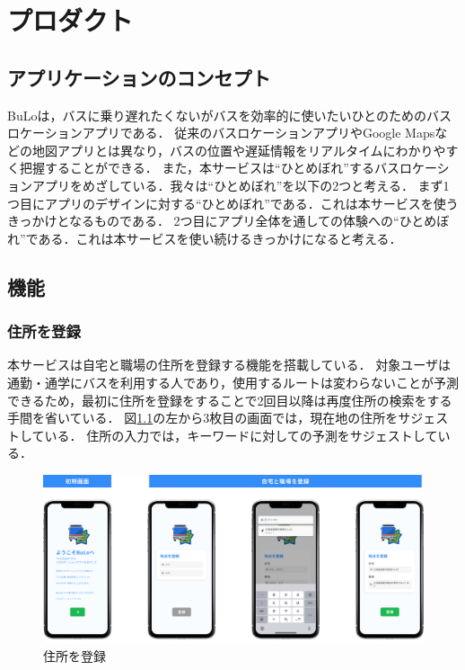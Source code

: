 \chapter{プロダクト}

\section{アプリケーションのコンセプト}
BuLoは，バスに乗り遅れたくないがバスを効率的に使いたいひとのためのバスロケーションアプリである．
従来のバスロケーションアプリやGoogle Mapsなどの地図アプリとは異なり，バスの位置や遅延情報をリアルタイムにわかりやすく把握することができる．
また，本サービスは``ひとめぼれ''するバスロケーションアプリをめざしている．我々は``ひとめぼれ''を以下の2つと考える．
まず1つ目にアプリのデザインに対する``ひとめぼれ''である．これは本サービスを使うきっかけとなるものである．
2つ目にアプリ全体を通しての体験への``ひとめぼれ''である．これは本サービスを使い続けるきっかけになると考える．

\section{機能}
\subsection{住所を登録}
本サービスは自宅と職場の住所を登録する機能を搭載している．
対象ユーザは通勤・通学にバスを利用する人であり，使用するルートは変わらないことが予測できるため，最初に住所を登録をすることで2回目以降は再度住所の検索をする手間を省いている．
図\ref{fig:feature_register}の左から3枚目の画面では，現在地の住所をサジェストしている．
住所の入力では，キーワードに対しての予測をサジェストしている．
\begin{figure}[H]
    \centering
    \includegraphics[width=14cm]{images/feature_register.png}
    \caption{住所を登録}
    \label{fig:feature_register}
\end{figure}

